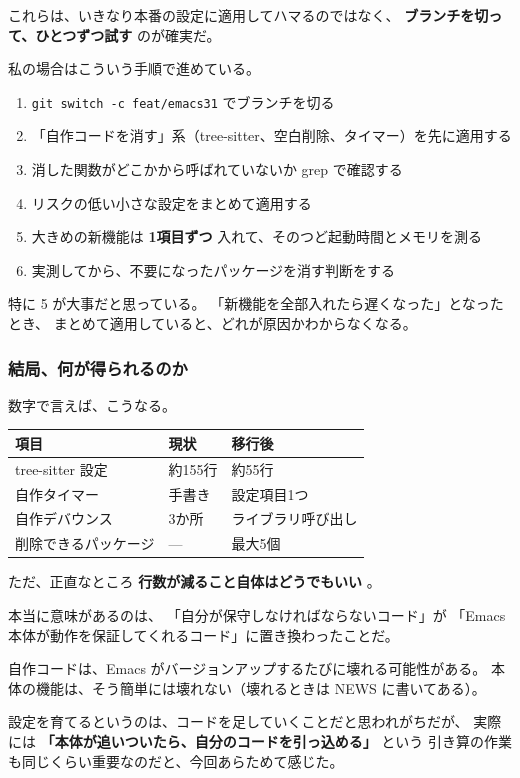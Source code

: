 \documentclass[11pt]{article}
\begin{document}
これらは、いきなり本番の設定に適用してハマるのではなく、
\textbf{ブランチを切って、ひとつずつ試す} のが確実だ。

私の場合はこういう手順で進めている。

\begin{enumerate}
\item \texttt{git switch -c feat/emacs31} でブランチを切る
\item 「自作コードを消す」系（tree-sitter、空白削除、タイマー）を先に適用する
\item 消した関数がどこかから呼ばれていないか grep で確認する
\item リスクの低い小さな設定をまとめて適用する
\item 大きめの新機能は \textbf{1項目ずつ} 入れて、そのつど起動時間とメモリを測る
\item 実測してから、不要になったパッケージを消す判断をする
\end{enumerate}

特に 5 が大事だと思っている。
「新機能を全部入れたら遅くなった」となったとき、
まとめて適用していると、どれが原因かわからなくなる。
\subsubsection{結局、何が得られるのか}
\label{sec:org8e319ae}

数字で言えば、こうなる。

\begin{center}
\begin{tabular}{lll}
項目 & 現状 & 移行後\\
\hline
tree-sitter 設定 & 約155行 & 約55行\\
自作タイマー & 手書き & 設定項目1つ\\
自作デバウンス & 3か所 & ライブラリ呼び出し\\
削除できるパッケージ & — & 最大5個\\
\end{tabular}
\end{center}

ただ、正直なところ \textbf{行数が減ること自体はどうでもいい} 。

本当に意味があるのは、
「自分が保守しなければならないコード」が
「Emacs 本体が動作を保証してくれるコード」に置き換わったことだ。

自作コードは、Emacs がバージョンアップするたびに壊れる可能性がある。
本体の機能は、そう簡単には壊れない（壊れるときは NEWS に書いてある）。

設定を育てるというのは、コードを足していくことだと思われがちだが、
実際には \textbf{「本体が追いついたら、自分のコードを引っ込める」} という
引き算の作業も同じくらい重要なのだと、今回あらためて感じた。
\end{document}
